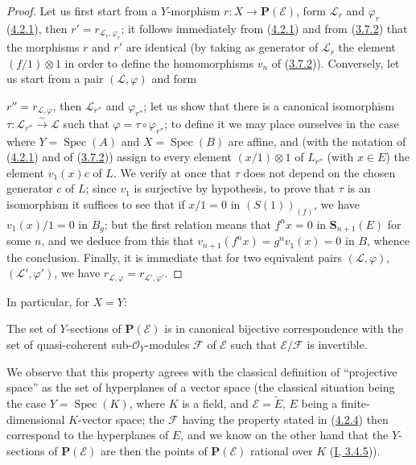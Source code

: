 \begin{proof}
Let us first start from a $Y$-morphism $r:X\to\mathbf{P}(\mathcal{E})$, form
$\mathcal{L}_r$ and $\varphi_r$ (\hyperref[II.4.2.1]{4.2.1}), then
$r'=r_{\mathcal{L}_r,\varphi_r}$; it follows immediately from
(\hyperref[II.4.2.1]{4.2.1}) and from
(\hyperref[II.3.7.2]{3.7.2}) that the morphisms $r$ and $r'$ are
identical (by taking as generator of $\mathcal{L}_r$ the element
$(f/1)\otimes1$ in order to define the homomorphisms $v_n$ of
(\hyperref[II.3.7.2]{3.7.2})). Conversely, let us start from a pair
$(\mathcal{L},\varphi)$ and form


$r''=r_{\mathcal{L},\varphi}$, then $\mathcal{L}_{r''}$ and
$\varphi_{r''}$; let us show that there is a canonical isomorphism
$\tau:\mathcal{L}_{r''}\xrightarrow{\sim}\mathcal{L}$ such that
$\varphi=\tau\circ\varphi_{r''}$; to define it we may place ourselves in the
case where $Y=\operatorname{Spec}(A)$ and $X=\operatorname{Spec}(B)$ are affine,
and (with the notation of (\hyperref[II.4.2.1]{4.2.1}) and of
(\hyperref[II.3.7.2]{3.7.2})) assign to every element
$(x/1)\otimes1$ of $L_{r''}$ (with $x\in E$) the element $v_1(x)c$ of $L$. We
verify at once that $\tau$ does not depend on the chosen generator $c$ of $L$;
since $v_1$ is surjective by hypothesis, to prove that $\tau$ is an
isomorphism it suffices to see that if $x/1=0$ in $(S(1))_{(f)}$, we have
$v_1(x)/1=0$ in $B_g$; but the first relation means that $f^nx=0$
in $\mathbf{S}_{n+1}(E)$ for some $n$, and we deduce from this that
$v_{n+1}(f^nx)=g^nv_1(x)=0$ in $B$, whence the conclusion. Finally, it is
immediate that for two equivalent pairs $(\mathcal{L},\varphi)$,
$(\mathcal{L}',\varphi')$, we have
$r_{\mathcal{L},\varphi}=r_{\mathcal{L}',\varphi'}$.
\end{proof}

In particular, for $X=Y$:

\begin{theorem}[4.2.4]
\label{II.4.2.4}
The set of $Y$-sections of $\mathbf{P}(\mathcal{E})$ is in canonical
bijective correspondence with the set of quasi-coherent
sub-$\mathcal{O}_Y$-modules $\mathcal{F}$ of $\mathcal{E}$
such that $\mathcal{E}/\mathcal{F}$ is invertible.
\end{theorem}

We observe that this property agrees with the classical definition of
``projective space'' as the set of hyperplanes of a vector
space (the classical situation being the case $Y=\operatorname{Spec}(K)$, where
$K$ is a field, and $\mathcal{E}=\widetilde{E}$, $E$ being a finite-dimensional
$K$-vector space; the $\mathcal{F}$ having the property stated
in (\hyperref[II.4.2.4]{4.2.4}) then correspond to the hyperplanes of
$E$, and we know on the other hand that the $Y$-sections of
$\mathbf{P}(\mathcal{E})$ are then the points of
$\mathbf{P}(\mathcal{E})$ rational over $K$
(\hyperref[I.3.4.5]{I, 3.4.5})).

